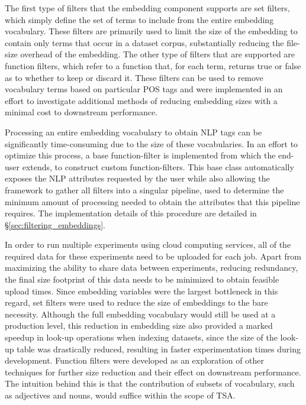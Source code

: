 \documentclass[12pt, a4paper]{report}
\theoremstyle{definition}
\theoremstyle{definition}%
\theoremstyle{definition}%
\theoremstyle{definition}%
\theoremstyle{definition}%
\theoremstyle{definition}%
\begin{document}
The first type of filters that the embedding component supports are set filters, which simply define the set of terms to include from the entire embedding vocabulary. These filters are primarily used to limit the size of the embedding to contain only terms that occur in a dataset corpus, substantially reducing the file-size overhead of the embedding. The other type of filters that are supported are function filters, which refer to a function that, for each term, returns true or false as to whether to keep or discard it. These filters can be used to remove vocabulary terms based on particular POS tags and were implemented in an effort to investigate additional methods of reducing embedding sizes with a minimal cost to downstream performance.

Processing an entire embedding vocabulary to obtain NLP tags can be significantly time-consuming due to the size of these vocabularies. In an effort to optimize this process, a base function-filter is implemented from which the end-user extends, to construct custom function-filters. This base class automatically exposes the NLP attributes requested by the user while also allowing the framework to gather all filters into a singular pipeline, used to determine the minimum amount of processing needed to obtain the attributes that this pipeline requires. The implementation details of this procedure are detailed in \S\ref{sec:filtering_embeddings}.

In order to run multiple experiments using cloud computing services, all of the required data for these experiments need to be uploaded for each job. Apart from maximizing the ability to share data between experiments, reducing redundancy, the final size footprint of this data needs to be minimized to obtain feasible upload times. Since embedding variables were the largest bottleneck in this regard, set filters were used to reduce the size of embeddings to the bare necessity. Although the full embedding vocabulary would still be used at a production level, this reduction in embedding size also provided a marked speedup in look-up operations when indexing datasets, since the size of the look-up table was drastically reduced, resulting in faster experimentation times during development. Function filters were developed as an exploration of other techniques for further size reduction and their effect on downstream performance. The intuition behind this is that the contribution of subsets of vocabulary, such as adjectives and nouns, would suffice within the scope of TSA.
\end{document}
